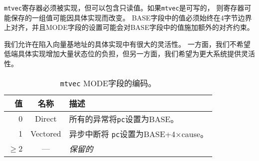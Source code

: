 \iffalse
The {\tt mtvec} register must always be implemented, but can contain
a read-only value.  If {\tt mtvec} is writable, the set of values
the register may hold can vary by implementation.  The value in the BASE field
must always be aligned on a 4-byte boundary, and the MODE setting may impose
additional alignment constraints on the value in the BASE field.
\fi

{\tt mtvec}寄存器必须被实现，但可以包含只读值。如果{\tt mtvec}是可写的，
则寄存器可能保存的一组值可能因具体实现而改变。
BASE字段中的值必须始终在4字节边界上对齐，并且MODE字段的设置可能会对BASE字段中的值施加额外的对齐约束。

\iffalse
\begin{commentary}
We allow for considerable flexibility in implementation of the trap
vector base address.  On the one hand, we do not wish to burden low-end
implementations with a large number of state bits, but on the other
hand, we wish to allow flexibility for larger systems.
\end{commentary}
\fi

\begin{commentary}
我们允许在陷入向量基地址的具体实现中有很大的灵活性。
一方面，我们不希望低端具体实现增加大量状态位的负担，但另一方面，我们希望为更大系统提供灵活性。
\end{commentary}

\begin{table*}[h!]
\begin{center}
\begin{tabular}{|r|c|l|}
\hline
值 & 名称 & 描述 \\
\hline
0      & Direct   & 所有的异常将{\tt pc}设置为BASE。 \\
1      & Vectored & 异步中断将 {\tt pc}设置为BASE+4$\times$cause。 \\
$\ge$2 & --- & {\em 保留的} \\
\hline
\end{tabular}
\end{center}
\caption{{\tt mtvec} MODE字段的编码。}
\label{mtvec-mode}
\end{table*}

